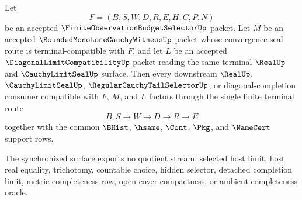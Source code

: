 \begin{theorem}
\label{thm:finite-observation-budget-selector-bounded-monotone-diagonal-synchronization}
Let
$$
F=(B,S,W,D,R,E,H,C,P,N)
$$
be an accepted $\FiniteObservationBudgetSelectorUp$ packet. Let $M$ be an accepted $\BoundedMonotoneCauchyWitnessUp$ packet whose convergence-seal route is terminal-compatible with $F$, and let $L$ be an accepted $\DiagonalLimitCompatibilityUp$ packet reading the same terminal $\RealUp$ and $\CauchyLimitSealUp$ surface. Then every downstream $\RealUp$, $\CauchyLimitSealUp$, $\RegularCauchyTailSelectorUp$, or diagonal-completion consumer compatible with $F$, $M$, and $L$ factors through the single finite terminal route
$$
B,S \to W \to D \to R \to E
$$
together with the common $\BHist$, $\hsame$, $\Cont$, $\Pkg$, and $\NameCert$ support rows.

The synchronized surface exports no quotient stream, selected host limit, host real equality, trichotomy, countable choice, hidden selector, detached completion limit, metric-completeness row, open-cover compactness, or ambient completeness oracle.
\end{theorem}
